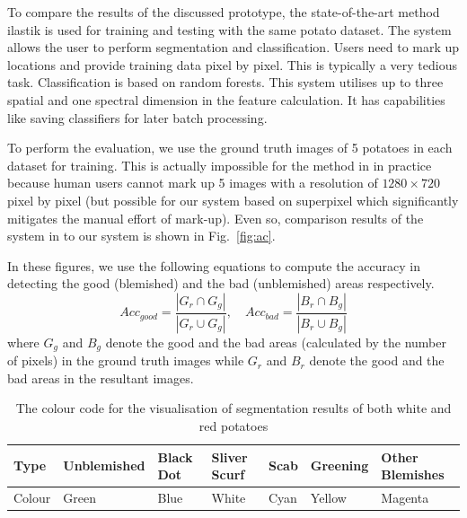 \documentclass[twocolumn]{svjour3}          %
\begin{document}
To compare the results of the discussed prototype, the state-of-the-art method ilastik \cite{SC11} is used for training and testing with the same potato dataset. The system allows the user to perform segmentation and classification. Users need to mark up locations and provide training data pixel by pixel. This is typically a very tedious task. Classification is based on random forests. This system utilises up to three spatial and one spectral dimension in the feature calculation. It has capabilities like saving classifiers for later batch processing. 

To perform the evaluation, we use the ground truth images of 5 potatoes in each dataset for training. This is actually impossible for the method in \cite{SC11} in practice because human users cannot mark up 5 images with a resolution of $1280 \times 720$ pixel by pixel (but possible for our system based on superpixel which significantly mitigates the manual effort of mark-up). Even so, comparison results of the system in \cite{SC11} to our system is shown in Fig.~\ref{fig:ac}. 

In these figures, we use the following equations to compute the accuracy in detecting the good (blemished) and the bad (unblemished) areas respectively.
\begin{equation}
Acc_{good}=\frac{\left|G_r\cap G_g\right|}{\left|G_r\cup G_g\right|}, \quad Acc_{bad}=\frac{\left|B_r\cap B_g\right|}{\left|B_r\cup B_g\right|}
\end{equation}
where $G_g$ and $B_g$ denote the good and the bad areas (calculated by the number of pixels) in the ground truth images while  $G_r$ and $B_r$ denote the good and the bad areas in the resultant images.
\begin{table}[t]
\centering
\begin{tabular}{ l||l|l|l|l|l|l }
\hline
   Type&Unblemished & Black Dot& Sliver Scurf& Scab & Greening & Other Blemishes  \\ \hline
   Colour&Green & Blue & White & Cyan & Yellow & Magenta \\
	\hline
\end{tabular}
\caption{The colour code for the visualisation of segmentation results of both white and red potatoes}
\label{tab:t1}
\end{table}
\end{document}
